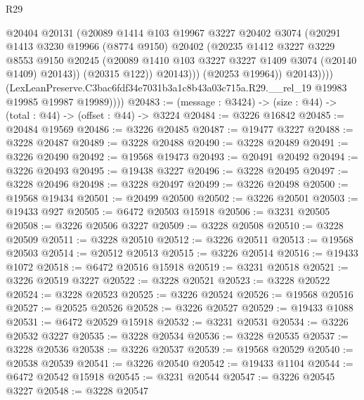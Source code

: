 \begin{lexlean}{R29}
\begin{coremodule}
                        @20404
                        @20131
                        (@20089
                          @1414
                          @103
                          @19967
                          @3227
                          @20402
                          @3074
                          (@20291
                            @1413
                            @3230
                            @19966
                            (@8774 @9150)
                            @20402
                            (@20235
                              @1412
                              @3227
                              @3229
                              @8553
                              @9150
                              @20245
                              (@20089 @1410 @103 @3227 @3227 @1409 @3074 (@20140 @1409) @20143))
                            (@20315 @122))
                          @20143)))
                    (@20253 @19964))
                  @20143))))
          (LexLeanPreserve.C3bac6fdf34e7031b3a1c8b43a03c715a.R29.__rel_19
            @19983
            @19985
            @19987
            @19989))))
@20483 := (message : @3424) -> (size : @44) -> (total : @44) -> (offset : @44) -> @3224
@20484 := @3226 @16842
@20485 := @20484 @19569
@20486 := @3226 @20485
@20487 := @19477 @3227
@20488 := @3228 @20487
@20489 := @3228 @20488
@20490 := @3228 @20489
@20491 := @3226 @20490
@20492 := @19568 @19473
@20493 := @20491 @20492
@20494 := @3226 @20493
@20495 := @19438 @3227
@20496 := @3228 @20495
@20497 := @3228 @20496
@20498 := @3228 @20497
@20499 := @3226 @20498
@20500 := @19568 @19434
@20501 := @20499 @20500
@20502 := @3226 @20501
@20503 := @19433 @927
@20505 := @6472 @20503 @15918
@20506 := @3231 @20505
@20508 := @3226 @20506 @3227
@20509 := @3228 @20508
@20510 := @3228 @20509
@20511 := @3228 @20510
@20512 := @3226 @20511
@20513 := @19568 @20503
@20514 := @20512 @20513
@20515 := @3226 @20514
@20516 := @19433 @1072
@20518 := @6472 @20516 @15918
@20519 := @3231 @20518
@20521 := @3226 @20519 @3227
@20522 := @3228 @20521
@20523 := @3228 @20522
@20524 := @3228 @20523
@20525 := @3226 @20524
@20526 := @19568 @20516
@20527 := @20525 @20526
@20528 := @3226 @20527
@20529 := @19433 @1088
@20531 := @6472 @20529 @15918
@20532 := @3231 @20531
@20534 := @3226 @20532 @3227
@20535 := @3228 @20534
@20536 := @3228 @20535
@20537 := @3228 @20536
@20538 := @3226 @20537
@20539 := @19568 @20529
@20540 := @20538 @20539
@20541 := @3226 @20540
@20542 := @19433 @1104
@20544 := @6472 @20542 @15918
@20545 := @3231 @20544
@20547 := @3226 @20545 @3227
@20548 := @3228 @20547

\end{coremodule}
\end{lexlean}
